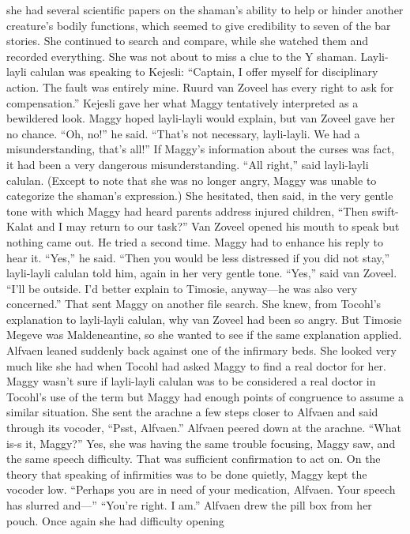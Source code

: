 \documentclass[9pt]{article}
\begin{document}
she had several scientific papers on the shaman’s ability to help or hinder another creature’s bodily
functions, which seemed to give credibility to seven of the bar stories. She continued to search and
compare, while she watched them and recorded everything. She was not about to miss a clue to the Y
shaman.
Layli-layli calulan was speaking to Kejesli: “Captain, I offer myself for disciplinary action. The fault
was entirely mine. Ruurd van Zoveel has every right to ask for compensation.”
Kejesli gave her what Maggy tentatively interpreted as a bewildered look. Maggy hoped layli-layli
would explain, but van Zoveel gave her no chance. “Oh, no!” he said. “That’s not necessary, layli-layli.
We had a misunderstanding, that’s all!”
If Maggy’s information about the curses was fact, it had been a very dangerous misunderstanding.
“All right,” said layli-layli calulan. (Except to note that she was no longer angry, Maggy was unable
to categorize the shaman’s expression.) She hesitated, then said, in the very gentle tone with which
Maggy had heard parents address injured children, “Then swift-Kalat and I may return to our task?”
Van Zoveel opened his mouth to speak but nothing came out. He tried a second time. Maggy had to
enhance his reply to hear it. “Yes,” he said.
“Then you would be less distressed if you did not stay,” layli-layli calulan told him, again in her very
gentle tone.
“Yes,” said van Zoveel. “I’ll be outside. I’d better explain to Timosie, anyway—he was also very
concerned.”
That sent Maggy on another file search. She knew, from Tocohl’s explanation to layli-layli calulan,
why van Zoveel had been so angry. But Timosie Megeve was Maldeneantine, so she wanted to see if the
same explanation applied.
Alfvaen leaned suddenly back against one of the infirmary beds. She looked very much like she had
when Tocohl had asked Maggy to find a real doctor for her. Maggy wasn’t sure if layli-layli calulan
was to be considered a real doctor in Tocohl’s use of the term but Maggy had enough points of
congruence to assume a similar situation.
She sent the arachne a few steps closer to Alfvaen and said through its vocoder, “Psst, Alfvaen.”
Alfvaen peered down at the arachne. “What is-s it, Maggy?”
Yes, she was having the same trouble focusing, Maggy saw, and the same speech difficulty. That was
sufficient confirmation to act on.
On the theory that speaking of infirmities was to be done quietly, Maggy kept the vocoder low.
“Perhaps you are in need of your medication, Alfvaen. Your speech has slurred and—”
“You’re right. I am.” Alfvaen drew the pill box from her pouch. Once again she had difficulty opening
\end{document}
